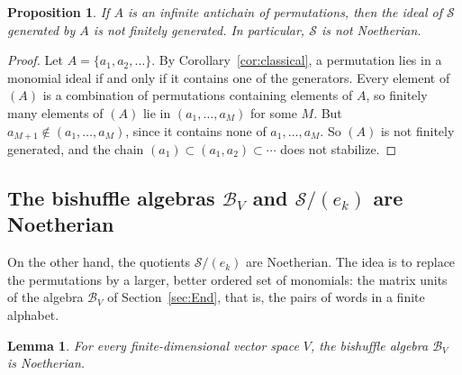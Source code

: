 \documentclass[11pt]{amsart}
\newtheorem{proposition}[theorem]{Proposition}
\newtheorem{lemma}[theorem]{Lemma}
\theoremstyle{definition}
\theoremstyle{remark}
\newcommand{\cB}{\mathcal{B}}
\newcommand{\cS}{\mathscr{S}}
\begin{document}
\begin{proposition}\label{prop:antichain}
If $A$ is an infinite antichain of permutations, then the ideal of $\cS$ generated by $A$ is not finitely generated. In particular, $\cS$ is not Noetherian.
\end{proposition}

\begin{proof}
Let $A=\{a_1,a_2,\dots\}$. By Corollary~\ref{cor:classical}, a permutation lies in a monomial ideal if and only if it contains one of the generators. Every element of $(A)$ is a combination of permutations containing elements of $A$, so finitely many elements of $(A)$ lie in $(a_1,\dots,a_M)$ for some $M$. But $a_{M+1}\notin(a_1,\dots,a_M)$, since it contains none of $a_1,\dots,a_M$. So $(A)$ is not finitely generated, and the chain $(a_1)\subset(a_1,a_2)\subset\cdots$ does not stabilize.
\end{proof}

\subsection{The bishuffle algebras $\cB_V$ and $\cS/(e_k)$ are Noetherian}
On the other hand, the quotients $\cS/(e_k)$ are Noetherian. The idea is to replace the permutations by a larger, better ordered set of monomials: the matrix units of the algebra $\cB_V$ of Section~\ref{sec:End}, that is, the pairs of words in a finite alphabet.

\begin{lemma}\label{lem:BV-noeth}
For every finite-dimensional vector space $V$, the bishuffle algebra $\cB_V$ is Noetherian.
\end{lemma}
\end{document}
